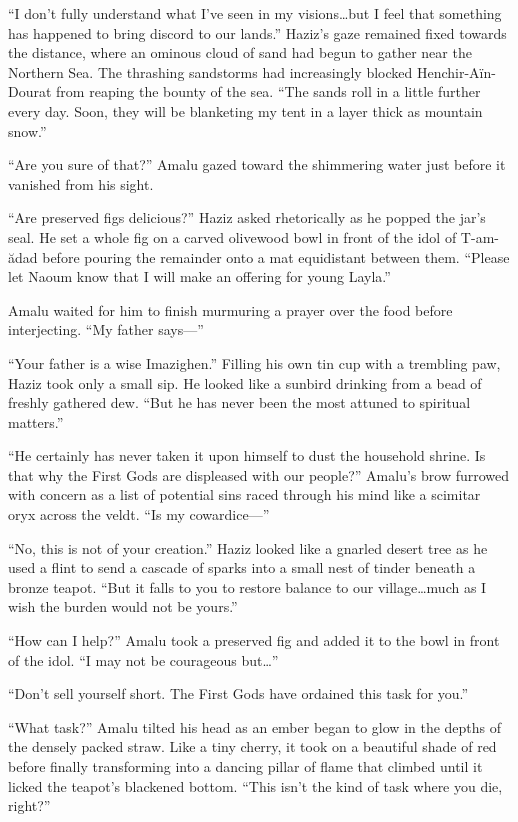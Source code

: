 ``I don't fully understand what I've seen in my visions\ldots but I feel that something has happened to bring discord to our lands.'' Haziz's gaze remained fixed towards the distance, where an ominous cloud of sand had begun to gather near the Northern Sea. The thrashing sandstorms had increasingly blocked Henchir-Aïn-Dourat from reaping the bounty of the sea. ``The sands roll in a little further every day. Soon, they will be blanketing my tent in a layer thick as mountain snow.''

``Are you sure of that?'' Amalu gazed toward the shimmering water just before it vanished from his sight.

``Are preserved figs delicious?'' Haziz asked rhetorically as he popped the jar's seal. He set a whole fig on a carved olivewood bowl in front of the idol of T-am-ădad before pouring the remainder onto a mat equidistant between them. ``Please let Naoum know that I will make an offering for young Layla.''

Amalu waited for him to finish murmuring a prayer over the food before interjecting. ``My father says---''

``Your father is a wise Imazighen.'' Filling his own tin cup with a trembling paw, Haziz took only a small sip. He looked like a sunbird drinking from a bead of freshly gathered dew. ``But he has never been the most attuned to spiritual matters.''

``He certainly has never taken it upon himself to dust the household shrine. Is that why the First Gods are displeased with our people?'' Amalu's brow furrowed with concern as a list of potential sins raced through his mind like a scimitar oryx across the veldt. ``Is my cowardice---''

``No, this is not of your creation.'' Haziz looked like a gnarled desert tree as he used a flint to send a cascade of sparks into a small nest of tinder beneath a bronze teapot. ``But it falls to you to restore balance to our village\ldots much as I wish the burden would not be yours.''

``How can I help?'' Amalu took a preserved fig and added it to the bowl in front of the idol. ``I may not be courageous but\ldots''

``Don't sell yourself short. The First Gods have ordained this task for you.''

``What task?'' Amalu tilted his head as an ember began to glow in the depths of the densely packed straw. Like a tiny cherry, it took on a beautiful shade of red before finally transforming into a dancing pillar of flame that climbed until it licked the teapot's blackened bottom. ``This isn't the kind of task where you die, right?''

